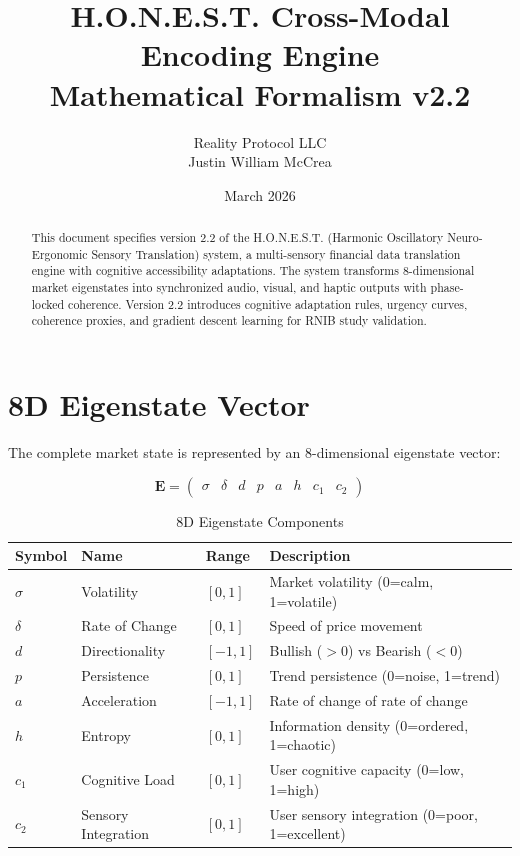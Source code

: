 \documentclass[11pt,a4paper]{article}
\title{H.O.N.E.S.T. Cross-Modal Encoding Engine \\ Mathematical Formalism v2.2}
\author{Reality Protocol LLC \\ Justin William McCrea}
\date{March 2026}
\begin{document}
\maketitle

\begin{abstract}
This document specifies version 2.2 of the H.O.N.E.S.T. (Harmonic Oscillatory Neuro-Ergonomic Sensory Translation) system, a multi-sensory financial data translation engine with cognitive accessibility adaptations. The system transforms 8-dimensional market eigenstates into synchronized audio, visual, and haptic outputs with phase-locked coherence. Version 2.2 introduces cognitive adaptation rules, urgency curves, coherence proxies, and gradient descent learning for RNIB study validation.
\end{abstract}

\tableofcontents

\section{8D Eigenstate Vector}
The complete market state is represented by an 8-dimensional eigenstate vector:

$$
\mathbf{E} = \begin{pmatrix}
\sigma & \delta & d & p & a & h & c_1 & c_2
\end{pmatrix}
$$

\begin{table}[h]
\centering
\caption{8D Eigenstate Components}
\begin{tabular}{llll}
\toprule
\textbf{Symbol} & \textbf{Name} & \textbf{Range} & \textbf{Description} \\
\midrule
$\sigma$ & Volatility & $[0,1]$ & Market volatility (0=calm, 1=volatile) \\
$\delta$ & Rate of Change & $[0,1]$ & Speed of price movement \\
$d$ & Directionality & $[-1,1]$ & Bullish ($>0$) vs Bearish ($<0$) \\
$p$ & Persistence & $[0,1]$ & Trend persistence (0=noise, 1=trend) \\
$a$ & Acceleration & $[-1,1]$ & Rate of change of rate of change \\
$h$ & Entropy & $[0,1]$ & Information density (0=ordered, 1=chaotic) \\
$c_1$ & Cognitive Load & $[0,1]$ & User cognitive capacity (0=low, 1=high) \\
$c_2$ & Sensory Integration & $[0,1]$ & User sensory integration (0=poor, 1=excellent) \\
\bottomrule
\end{tabular}
\end{table}
\end{document}
